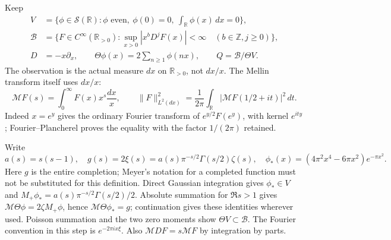 \documentclass[11pt]{article}
\newcommand{\R}{\mathbb R}
\newcommand{\B}{\mathscr B}
\newcommand{\MM}{\mathcal M}
\newcommand{\dd}{\,d}
\begin{document}
Keep
\begin{align}
 V&=\{\phi\in\mathcal S(\R):\phi\text{ even},\ \phi(0)=0,
                         \ \int_\R\phi(x)\dd x=0\},\nonumber\\
 \B&=\{F\in C^\infty(\R_{>0}):
       \sup_{x>0}|x^bD^jF(x)|<\infty\quad(b\in\mathbb Z,j\ge0)\},\nonumber\\
 D&=-x\partial_x,\qquad\Theta\phi(x)=2\sum_{n\ge1}\phi(nx),
 \qquad Q=\B/\Theta V.\label{eq:spaces}
\end{align}
The observation is the actual measure $dx$ on $\R_{>0}$, not $dx/x$.
The Mellin transform itself uses $dx/x$:
\begin{equation}
 \MM F(s)=\int_0^\infty F(x)x^s\frac{dx}{x},\qquad
 \|F\|_{L^2(dx)}^2=\frac1{2\pi}\int_\R
                         |\MM F(1/2+it)|^2\dd t.\label{eq:plancherel}
\end{equation}
Indeed $x=e^y$ gives the ordinary Fourier transform of
$e^{y/2}F(e^y)$, with kernel $e^{ity}$; Fourier--Plancherel proves
the equality with the factor $1/(2\pi)$ retained.

Write
\begin{equation}
 a(s)=s(s-1),\quad
 g(s)=2\xi(s)=a(s)\pi^{-s/2}\Gamma(s/2)\zeta(s),\quad
 \phi_*(x)=(4\pi^2x^4-6\pi x^2)e^{-\pi x^2}.\label{eq:seed}
\end{equation}
Here $g$ is the entire completion; Meyer's notation for a completed
function must not be substituted for this definition. Direct Gaussian
integration gives $\phi_*\in V$ and
$M_+\phi_*=a(s)\pi^{-s/2}\Gamma(s/2)/2$.
Absolute summation for $\Re s>1$ gives
$\MM\Theta\phi=2\zeta M_+\phi$, hence
$\MM\Theta\phi_*=g$; continuation gives these identities wherever used.
Poisson summation and the two zero moments show $\Theta V\subset\B$.
The Fourier convention in this step is $e^{-2\pi ix\xi}$.
Also $\MM DF=s\MM F$ by integration by parts.
\end{document}
